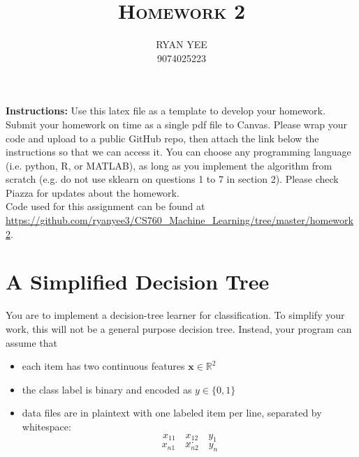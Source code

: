\documentclass[a4paper]{article}
\title{\textsc{Homework 2}} %
\author{
RYAN YEE \\
9074025223\\
}
\date{}
\theoremstyle{definition}
\newcommand{\RR}{\mathbb{R}}
\def\x{\mathbf x}
\begin{document}
\maketitle 


\textbf{Instructions:} 
Use this latex file as a template to develop your homework. Submit your homework on time as a single pdf file to Canvas. Please wrap your code and upload to a public GitHub repo, then attach the link below the instructions so that we can access it. You can choose any programming language (i.e. python, R, or MATLAB), as long as you implement the algorithm from scratch (e.g. do not use sklearn on questions 1 to 7 in section 2). Please check Piazza for updates about the homework.\\

Code used for this assignment can be found at \url{https://github.com/ryanyee3/CS760_Machine_Learning/tree/master/homework2}.

\section{A Simplified Decision Tree}
You are to implement a decision-tree learner for classification.
To simplify your work, this will not be a general purpose decision tree.  Instead, your program can assume that
\begin{itemize}
\item each item has two continuous features $\x \in \RR^2$
\item the class label is binary and encoded as $y \in \{0,1\}$
\item data files are in plaintext with one labeled item per line, separated by whitespace:
$$x_{11} \quad x_{12} \quad y_1$$
$$...$$
$$x_{n1} \quad x_{n2} \quad y_n$$
\end{itemize}
\end{document}
